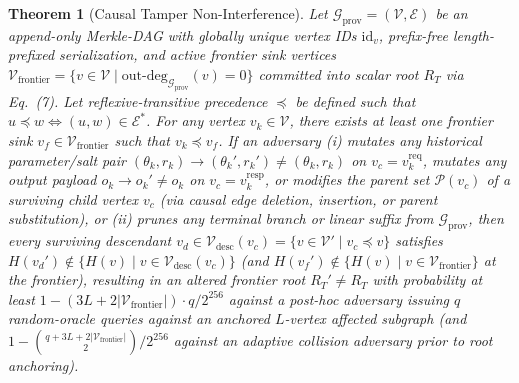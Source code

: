 \documentclass[conference,10pt]{IEEEtran}
\newtheorem{theorem}{Theorem}
\begin{document}
\begin{theorem}[Causal Tamper Non-Interference]
Let $\mathcal{G}_{\text{prov}} = (\mathcal{V}, \mathcal{E})$ be an append-only Merkle-DAG with globally unique vertex IDs $\text{id}_v$, prefix-free length-prefixed serialization, and active frontier sink vertices $\mathcal{V}_{\text{frontier}} = \{v \in \mathcal{V} \mid \text{out-deg}_{\mathcal{G}_{\text{prov}}}(v) = 0\}$ committed into scalar root $R_T$ via Eq.~(7). Let reflexive-transitive precedence $\preceq$ be defined such that $u \preceq w \iff (u, w) \in \mathcal{E}^*$. For any vertex $v_k \in \mathcal{V}$, there exists at least one frontier sink $v_f \in \mathcal{V}_{\text{frontier}}$ such that $v_k \preceq v_f$. If an adversary (i) mutates any historical parameter/salt pair $(\theta_k, r_k) \to (\theta_k', r_k') \neq (\theta_k, r_k)$ on $v_c = v_k^{\text{req}}$, mutates any output payload $o_k \to o_k' \neq o_k$ on $v_c = v_k^{\text{resp}}$, or modifies the parent set $\mathcal{P}(v_c)$ of a surviving child vertex $v_c$ (via causal edge deletion, insertion, or parent substitution), or (ii) prunes any terminal branch or linear suffix from $\mathcal{G}_{\text{prov}}$, then every surviving descendant $v_d \in \mathcal{V}_{\text{desc}}(v_c) = \{v \in \mathcal{V}' \mid v_c \preceq v\}$ satisfies $H(v_d') \notin \{H(v) \mid v \in \mathcal{V}_{\text{desc}}(v_c)\}$ (and $H(v_f') \notin \{H(v) \mid v \in \mathcal{V}_{\text{frontier}}\}$ at the frontier), resulting in an altered frontier root $R_T' \neq R_T$ with probability at least $1 - (3L + 2|\mathcal{V}_{\text{frontier}}|) \cdot q / 2^{256}$ against a post-hoc adversary issuing $q$ random-oracle queries against an anchored $L$-vertex affected subgraph (and $1 - \binom{q + 3L + 2|\mathcal{V}_{\text{frontier}}|}{2} / 2^{256}$ against an adaptive collision adversary prior to root anchoring).
\end{theorem}
\end{document}
